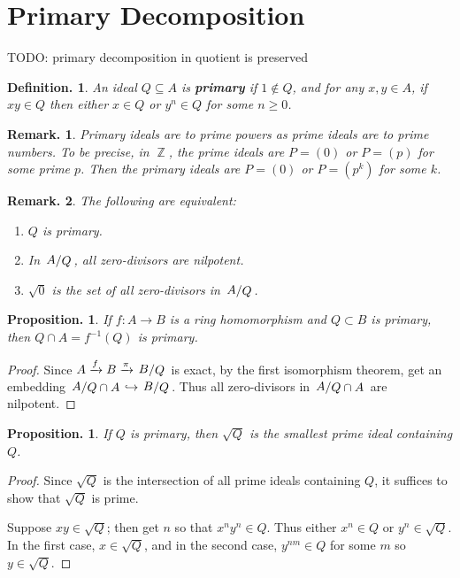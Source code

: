 \documentclass[11pt, a4paper]{memoir}
\DeclareMathOperator{\Z}{{\mathbb{Z}}}
\newcommand{\fto}[1]{\ensuremath{\xrightarrow{\scriptstyle{#1}}}}
\newcommand{\hto}[0]{\ensuremath{\hookrightarrow}}
\theoremstyle{change}
\newtheorem{proposition}[theorem]{Proposition.}
\theoremstyle{plain}
\theoremstyle{nonumberplain}
\newtheorem{definition}{Definition.}
\newtheorem{remark}{Remark.}
\newtheorem{proof}{Proof}
\newcommand{\quot}[2]{\mathchoice{\left.\raisebox{0.10em}{$#1$}\middle/\raisebox{-0.10em}{$#2$}\right.}
                                 {\left.\raisebox{0.04em}{$#1$}\middle/\raisebox{-0.04em}{$#2$}\right.}
                                 {\left.\raisebox{0.01em}{$#1$}\middle/\raisebox{-0.01em}{$#2$}\right.}
                                 {\left.\raisebox{0em}{$#1$}\middle/\raisebox{0em}{$#2$}\right.}}
\numberwithin{equation}{section}
\begin{document}
\section{Primary Decomposition}
TODO: primary decomposition in quotient is preserved
\begin{definition}
    An ideal $Q \subseteq A$ is \textbf{primary} if $1\notin Q$, and for any $x,y \in A$, if $xy \in Q$ then either $x \in Q$ or $y^n\in Q$ for some $n \geq 0$.
\end{definition}
\begin{remark}
    Primary ideals are to prime powers as prime ideals are to prime numbers.
    To be precise, in $\Z$, the prime ideals are $P=(0)$ or $P=(p)$ for some prime $p$.
    Then the primary ideals are $P=(0)$ or $P=(p^k)$ for some $k$.
\end{remark}
\begin{remark}
    The following are equivalent:
    \begin{enumerate}[nl,r]
        \item $Q$ is primary.
        \item In $\quot{A}{Q}$, all zero-divisors are nilpotent.
        \item $\sqrt{0}$ is the set of all zero-divisors in $\quot{A}{Q}$.
    \end{enumerate}
\end{remark}
\begin{proposition}
    If $f:A\to B$ is a ring homomorphism and $Q\subset B$ is primary, then $Q\cap A=f^{-1}(Q)$ is primary.
\end{proposition}
\begin{proof}
    Since $A\fto{f}B\fto{\pi}\quot{B}{Q}$ is exact, by the first isomorphism theorem, get an embedding $\quot{A}{Q\cap A}\hto \quot{B}{Q}$.
    Thus all zero-divisors in $\quot{A}{Q\cap A}$ are nilpotent.
\end{proof}
\begin{proposition}
    If $Q$ is primary, then $\sqrt{Q}$ is the smallest prime ideal containing $Q$.
\end{proposition}
\begin{proof}
    Since $\sqrt{Q}$ is the intersection of all prime ideals containing $Q$, it suffices to show that $\sqrt{Q}$ is prime.

    Suppose $xy\in\sqrt{Q}$; then get $n$ so that $x^ny^n\in Q$.
    Thus either $x^n\in Q$ or $y^n\in\sqrt{Q}$.
    In the first case, $x\in\sqrt{Q}$, and in the second case, $y^{nm}\in Q$ for some $m$ so $y\in\sqrt{Q}$.
\end{proof}
\end{document}
